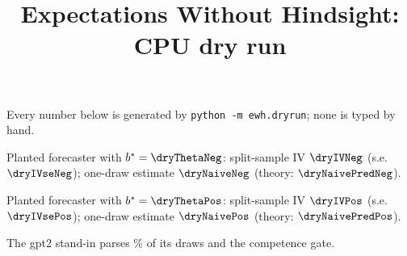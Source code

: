 \documentclass[11pt]{article}
\title{Expectations Without Hindsight: CPU dry run}
\date{}
\begin{document}
\maketitle
\noindent Every number below is generated by \texttt{python -m ewh.dryrun}; none is typed by hand.

Planted forecaster with $b^\ast = \dryThetaNeg$: split-sample IV $\dryIVNeg$ (s.e.\ $\dryIVseNeg$);
one-draw estimate $\dryNaiveNeg$ (theory: $\dryNaivePredNeg$).

Planted forecaster with $b^\ast = \dryThetaPos$: split-sample IV $\dryIVPos$ (s.e.\ $\dryIVsePos$);
one-draw estimate $\dryNaivePos$ (theory: $\dryNaivePredPos$).

The gpt2 stand-in parses \dryGptParse\% of its draws and \dryGptGate{} the competence gate.
\end{document}

